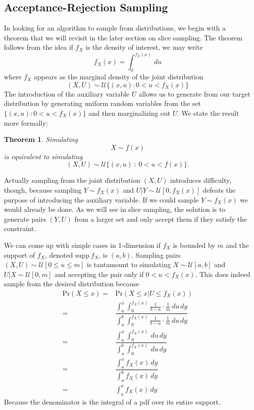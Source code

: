 \documentclass[11pt, a4paper]{article}
\theoremstyle{plain}
\newtheorem{thm}{Theorem}[section] %
\theoremstyle{definition}
\newcommand{\supp}{\mbox{supp}~}
\newcommand{\pr}{\mathrm{Pr}}
\begin{document}
\subsection{Acceptance-Rejection Sampling}
In looking for an algorithm to sample from distributions, we begin
with a theorem that we will revisit in the later section on slice sampling.
The theorem follows from the idea if $f_X$ is the density of interest, we
may write $$f_X(x) = \int_0^{f_X(x)}\,du$$
where $f_X$ appears as the marginal density of the joint distribution
$$(X, U) \sim \mathcal{U}\{(x, u) : 0 < u < f_X(x)\}$$
The introduction of the auxiliary variable $U$ allows
us to generate from our target distribution by generating uniform
random variables from the set $\{(x, u) : 0 < u < f_X(x)\}$ and then marginalizing
out $U$. We state the result more formally:
\begin{thm} 
Simulating $$X \sim f(x)$$ is equivalent to simulating $$(X, U) \sim \mathcal{U}\{(x, u)~:~0<u<f(x)\}.$$
\end{thm}
Actually sampling from the joint distribution $(X, U)$ introduces difficulty, though,
because sampling $Y \sim f_X(x)$ and $U | Y \sim \mathcal{U}[0, f_X(x)]$ defeats
the purpose of introducing the auxiliary variable. If we could sample $Y \sim f_X(x)$
we would already be done. As we will see in slice sampling, the solution
is to generate pairs $(Y, U)$ from a larger set and only accept them
if they satisfy the constraint.

We can come up with simple cases in 1-dimension if $f_X$ is bounded by $m$
and the support of $f_X$, denoted $\supp f_X$, is $(a, b)$. Sampling
pairs $(X, U) \sim \mathcal{U}[0 \le u \le m]$ is tantamount to simulating $X \sim \mathcal{U}[a, b]$
and $U|X \sim \mathcal{U}[0, m]$ and accepting the pair
only if $0 < u < f_X(x)$. This does indeed sample from
the desired distribution because
\begin{align*}
\pr(X \le x) ={}& \pr(X \le x | U \le f_X(x))\\
={}& \dfrac{\int_a^x\int_0^{f_X(x)} \frac{1}{b-a}\cdot\frac{1}{m}\,du\,dy}{\int_a^b\int_0^{f_X(x)} \frac{1}{b-a}\cdot\frac{1}{m}\,du\,dy}\\
={}&  \dfrac{\int_a^x\int_0^{f_X(x)} \,du\,dy}{\int_a^b\int_0^{f_X(x)}\,du\,dy}\\
={}&  \dfrac{\int_a^x f_X(x) \,dy}{\int_a^b f_X(x)\,dy}\\
={}& \int_a^x f_X(x) \,dy
\end{align*}
Because the denominator is the integral of a pdf over its entire support. 
\end{document}
